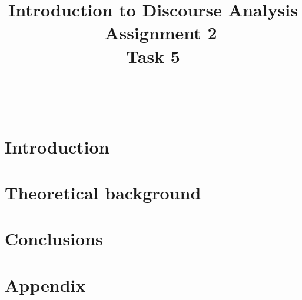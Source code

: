 \documentclass[11pt]{article}
\title{\LARGE Introduction to Discourse Analysis -- Assignment 2 \\ Task 5}
\date{}
\begin{document}
\maketitle

\,
\vspace{-5em}



\section{Introduction}{
}

\section{Theoretical background}{
}

\section{Conclusions}{
}




\section*{Appendix}{

}
\end{document}
